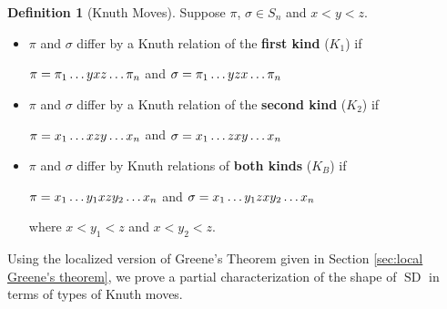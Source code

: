 \documentclass[submission]{FPSAC2021}
\theoremstyle{plain}
\theoremstyle{definition}
\newtheorem{definition}[theorem]{Definition}
\numberwithin{equation}{section}
\DeclareMathOperator{\SDself}{SD}
\begin{document}
\begin{definition}[Knuth Moves]
       Suppose $\pi$, $\sigma \in S_n$ and $x<y<z$.
            \begin{itemize}
                \item $\pi$ and $\sigma$ differ by a Knuth relation of the \textbf{first kind} ($K_1$) if %
                \begin{center}
                $\pi=\pi_1 \dots \textcolor{black}{y}\textcolor{black}{x}\textcolor{black}{z} 
                \dots \pi_n$
                and
                $\sigma=\pi_1 \dots \textcolor{black}{y}\textcolor{black}{z}\textcolor{black}{x} \dots \pi_n$ 
                \end{center} 
                
                \item $\pi$ and $\sigma$ differ by a Knuth relation of the \textbf{second kind} ($K_2$) if \begin{center}
                $\pi=x_1 \dots \textcolor{black}{x}\textcolor{black}{z}\textcolor{black}{y} \dots x_n$ and $\sigma=x_1 \dots \textcolor{black}{z}\textcolor{black}{x}\textcolor{black}{y} \dots x_n$
                \end{center}  
                
                \item $\pi$ and $\sigma$ differ by Knuth relations of \textbf{both kinds} ($K_B$) if \begin{center} 
                $\pi=x_1 \dots \textcolor{black}{y_1}\textcolor{black}{x}\textcolor{black}{z}\textcolor{black}{y_2} \dots x_n$ and $\sigma=x_1 \dots \textcolor{black}{y_1}\textcolor{black}{z}\textcolor{black}{x}\textcolor{black}{y_2} \dots x_n$ %
                \end{center}
        where 
         $x<y_1<z$ and  $x<y_2<z$.
        \end{itemize}
\end{definition}


Using the localized version of Greene's Theorem 
given in Section \ref{sec:local Greene's theorem}, 
we prove a partial characterization of 
  the shape of 
  $\SDself$  
in terms of types of Knuth moves.
\end{document}
